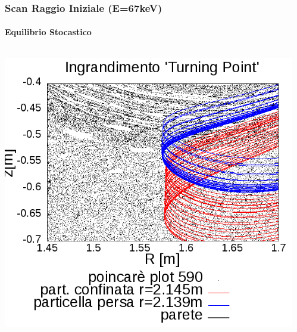 
\begin{frame}
\frametitle{Scan Raggio Iniziale (E=67keV)}
\framesubtitle{Equilibrio Stocastico}
\begin{columns}
	\begin{column}{0.4\textwidth}
		\begin{center}
		\includegraphics[scale=0.28]{Immagini/Simulazioni/Single/590/confronto_67.png}
		\end{center}
	\end{column}
	\begin{column}{0.4\textwidth}
		\begin{center}

\end{center}
\end{column}
\end{columns}
\end{frame}
